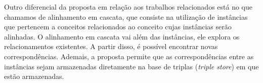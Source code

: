 Outro diferencial da proposta em relação aos trabalhos relacionados está no que chamamos de alinhamento em cascata, que consiste na utilização de instâncias que pertencem a conceitos relacionados ao conceito cujas instâncias serão alinhadas.  O alinhamento em cascata vai além das instâncias, ele explora os relacionamentos existentes. A partir disso, é possível encontrar novas correspondências. Ademais, a proposta permite que as correspondências entre as instâncias sejam armazenadas diretamente na base de triplas (\textit{triple store}) em que estão armazenadas.
% 
% 
